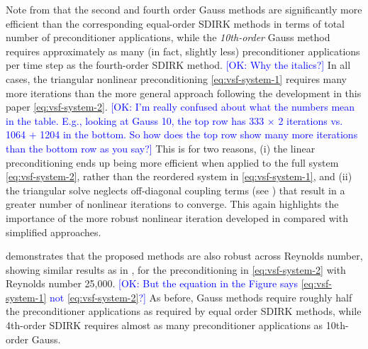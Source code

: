\documentclass[review]{siamart}
\newcommand{\OK}[1]{\textcolor{blue}{[OK: #1]}}
\begin{document}
Note from  that the second and fourth order Gauss methods
are significantly more efficient than the corresponding equal-order SDIRK
methods in terms of total number of preconditioner applications, while the
\textit{10th-order} Gauss method requires approximately
as many (in fact, slightly less) preconditioner
applications per time step as the fourth-order SDIRK method.
%
\OK{Why the italics?}
%
In all cases, the
triangular nonlinear preconditioning \eqref{eq:vsf-system-1} requires many more iterations than the
more general approach following the development in this paper \eqref{eq:vsf-system-2}.
%
\OK{I'm really confused about what the numbers mean in the table. E.g., looking at Gauss 10, the top row has 333 $\times$ 2 iterations vs. 1064 + 1204 in the bottom. So how does the top row show many more iterations than the bottom row as  you say?}
%
This is for two reasons, (i) the linear preconditioning ends up being more efficient
when applied to the full system \eqref{eq:vsf-system-2}, rather than the reordered
system in \eqref{eq:vsf-system-1}, and (ii) the triangular solve neglects off-diagonal
coupling terms (see ) that result in a greater number of
nonlinear iterations to converge. This again highlights the importance of the more robust
nonlinear iteration developed in  compared with simplified
approaches. 

 demonstrates that the proposed methods are also robust across
Reynolds number, showing similar results as in , for the
preconditioning in \eqref{eq:vsf-system-2} with Reynolds number 25,000. 
%
\OK{But the equation in the Figure says  \eqref{eq:vsf-system-1} not \eqref{eq:vsf-system-2}?}
%
As
before, Gauss methods require roughly half the preconditioner applications as
required by equal order SDIRK methods, while 4th-order SDIRK requires almost as many
preconditioner applications as 10th-order Gauss.
\end{document}

